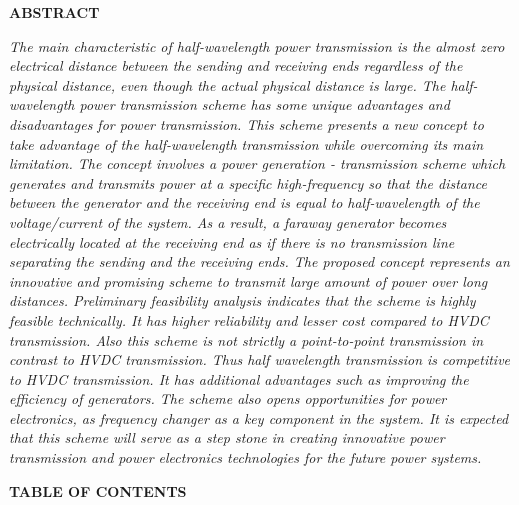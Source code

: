 \documentclass[12pt,a4paper]{reportmod}
\makeatletter
\newcommand*{\toccontents}{\@starttoc{toc}}
\makeatother
\begin{document}
\newpage
\thispagestyle{empty}%
\begin{center}
\begin{large}
\textbf{ABSTRACT}
\end{large}
\end{center}
\onehalfspacing
\begin{large}
\par\textit{The main characteristic of half-wavelength power transmission is the almost zero electrical distance between the sending and receiving ends regardless of the physical distance, even though the actual physical distance is large. The half-wavelength power transmission scheme has some unique advantages and disadvantages for power transmission. This scheme presents a new concept to take advantage of the half-wavelength transmission while overcoming its main limitation. The concept involves a power generation - transmission scheme which generates and transmits power at a specific high-frequency so that the distance between the generator and the receiving end is equal to half-wavelength of the voltage/current of the system. As a result, a faraway generator becomes electrically located at the receiving end as if there is no transmission line separating the sending and the receiving ends. The proposed concept represents an innovative and promising scheme to transmit large amount of power over long distances. Preliminary feasibility analysis indicates that the scheme is highly feasible technically. It has higher reliability and lesser cost compared to HVDC transmission. Also this scheme is not strictly a point-to-point transmission in contrast to HVDC transmission. Thus half wavelength transmission is competitive to HVDC transmission. It has additional advantages such as improving the efficiency of generators. The scheme also opens opportunities for power electronics, as frequency changer as a key component in the system. It is expected that this scheme will serve as a step stone in creating innovative power transmission and power electronics technologies for the future power systems.}
\end{large}

\newpage
\thispagestyle{empty}%
\begin{center}
\begin{large}
\textbf{TABLE OF CONTENTS}
\end{large}
\end{center}
\toccontents
\end{document}
